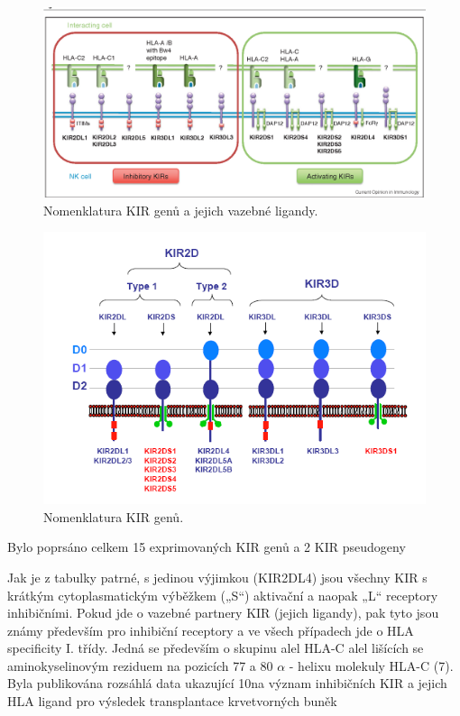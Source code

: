 \documentclass[czech,DP]{thesiskiv}
\begin{document}
\begin{figure}[H]		
		\centering
		\includegraphics[width=\textwidth]{./img/KIR_nomenklatura2.png}
		\caption{Nomenklatura KIR genů a jejich vazebné ligandy. \cite{KIR_img_nomenklatura}}
		\label{fig:img_kir_nomenklatura}
\end{figure}


\begin{figure}[H]		
		\centering
		\includegraphics[width=\textwidth]{./img/KIR_nomenklatura.png}
		\caption{Nomenklatura KIR genů.}
		\label{fig:img_kir_nomenklatura}
\end{figure}

Bylo poprsáno celkem 15 exprimovaných KIR genů a 2 KIR pseudogeny

Jak je z tabulky patrné, s jedinou výjimkou (KIR2DL4) jsou všechny
KIR s krátkým cytoplasmatickým výběžkem („S“) aktivační a naopak
„L“ receptory inhibičními.
Pokud jde o vazebné partnery KIR (jejich ligandy), pak tyto jsou
známy především pro inhibiční receptory a ve všech případech jde o
HLA specificity I. třídy. Jedná se především o skupinu alel HLA-C alel
lišících se aminokyselinovým 
reziduem na pozicích
 77 a 80 $\alpha$
- helixu molekuly HLA-C (7). Byla publikována rozsáhlá data ukazující
10na význam inhibičních KIR a jejich HLA ligand pro výsledek
transplantace krvetvorných buněk
\end{document}
